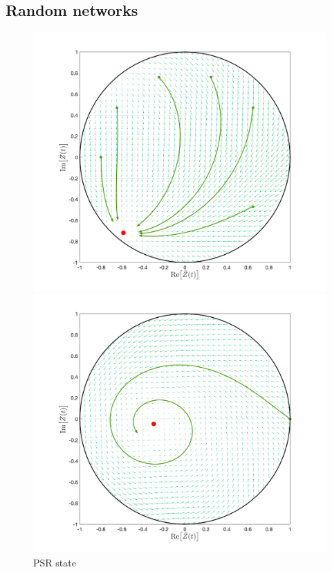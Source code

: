 \subsection{Random networks}
\begin{figure}[H]
  \includegraphics[width=\linewidth, trim={2cm 1cm 2cm 1.5cm },clip]{../Figures/MFOARPSR_random.png}
  \caption{PSR state}\label{fig:MFRPSR}
\endminipage\hfill
{}
  \includegraphics[width=\linewidth, trim={2cm 1cm 2cm 1.5cm },clip]{../Figures/MFOARPSS_random.png}

\end{figure}

